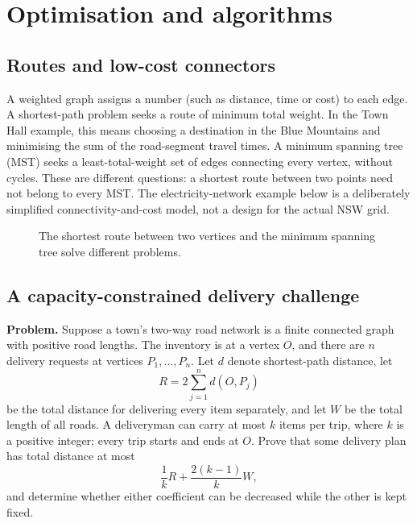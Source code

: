 \chapter{Optimisation and algorithms}
\section*{Routes and low-cost connectors}
A weighted graph assigns a number (such as distance, time or cost) to each edge. A shortest-path problem seeks a route of minimum total weight. In the Town Hall example, this means choosing a destination in the Blue Mountains and minimising the sum of the road-segment travel times. A minimum spanning tree (MST) seeks a least-total-weight set of edges connecting every vertex, without cycles. These are different questions: a shortest route between two points need not belong to every MST. The electricity-network example below is a deliberately simplified connectivity-and-cost model, not a design for the actual NSW grid.

\begin{figure}[htbp]
\centering
{}
\caption{The shortest route between two vertices and the minimum spanning tree solve different problems.}
\end{figure}

\section{A capacity-constrained delivery challenge}
\Challenge{} \Uni{} \textbf{Problem.} Suppose a town's two-way road network is a finite connected graph with positive road lengths. The inventory is at a vertex $O$, and there are $n$ delivery requests at vertices $P_1,\ldots,P_n$. Let $d$ denote shortest-path distance, let
\[
R=2\sum_{j=1}^n d(O,P_j)
\]
be the total distance for delivering every item separately, and let $W$ be the total length of all roads. A deliveryman can carry at most $k$ items per trip, where $k$ is a positive integer; every trip starts and ends at $O$. Prove that some delivery plan has total distance at most
\[
\frac{1}{k}R+\frac{2(k-1)}{k}W,
\]
and determine whether either coefficient can be decreased while the other is kept fixed.

